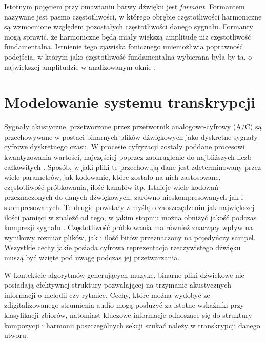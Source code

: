 \documentclass[12pt,a4paper,twoside]{mwart}
\begin{document}
Istotnym pojęciem przy omawianiu barwy dźwięku jest \textit{formant}. Formantem nazywane jest pasmo częstotliwości, w którego obrębie częstotliwości harmoniczne są wzmocnione względem pozostałych częstotliwości danego sygnału. Formanty mogą sprawić, że harmoniczne będą miały większą amplitudę niż częstotliwość fundamentalna. Istnienie tego zjawiska fonicznego uniemożliwia poprawność podejścia, w którym jako częstotliwość fundamentalna wybierana była by ta, o największej amplitudzie w analizowanym oknie 
\cite[24-25]{Transcription:Klapuri:Phd}
.
\newpage
\section{Modelowanie systemu transkrypcji} \label{sec:modelowanieSystemu}
Sygnały akustyczne, przetworzone przez przetwornik analogowo-cyfrowy (A/C) są przechowywane w postaci binarnych plików dźwiękowych jako dyskretne sygnały cyfrowe dyskretnego czasu. W procesie cyfryzacji zostały poddane procesowi kwantyzowania wartości, najczęściej poprzez zaokrąglenie do najbliższych liczb całkowitych 
\cite[1-4]{CyfrowePrzetwarzanieSygnalowOdTeoriiDoZastosowan}
. Sposób, w jaki pliki te przechowują dane jest zdeterminowany przez wiele parametrów, jak kodowanie, które zostało na nich zastosowane, częstotliwość próbkowania, ilość kanałów itp. Istnieje wiele kodowań przeznaczonych do danych dźwiękowych, zarówno nieskompresowanych jak i skompresowanych. Te drugie powstały z myślą o zaoszczędzeniu jak największej ilości pamięci w znaleźć od tego, w jakim stopniu można obniżyć jakość podczas kompresji sygnału 
\cite[66]{Homerecording:DlaKazdego}
. Częstotliwość próbkowania ma również znaczący wpływ na wynikowy rozmiar plików, jak i ilość bitów przeznaczony na pojedyńczy sampel. Wszystkie cechy jakie posiada cyfrowa reprezentacja rzeczywistego dźwięku muszą być wzięte pod uwagę podczas jej przetwarzania.

W kontekście algorytmów generujących muzykę, binarne pliki dźwiękowe nie posiadają efektywnej struktury pozwalającej na trzymanie akustycznych informacji o melodii czy rytmice. Cechy, które można wydobyć ze zdigitalizowanego strumienia audio mogą posłużyć za istotne wskaźniki przy klasyfikacji zbiorów, natomiast kluczowe informacje odnoszące się do struktury kompozycji i harmonii poszczególnych sekcji szukać należy w transkrypcji danego utworu. 
\end{document}
